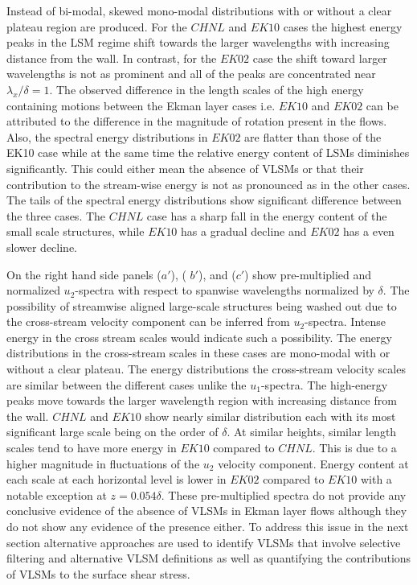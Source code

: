\documentclass{amsart}
\begin{document}
Instead of bi-modal, skewed mono-modal distributions with or without a clear plateau region are produced. For the $CHNL$ and $EK10$ cases the highest energy peaks in the LSM regime shift towards the larger wavelengths with increasing distance from the wall. In contrast, for the $EK02$ case the shift toward  larger wavelengths is not as prominent and all of the peaks are concentrated near $\lambda_x/\delta=1$. The observed difference in the length scales of the high energy containing motions between the Ekman layer cases i.e. $EK10$ and $EK02$ can be attributed to the difference in the magnitude of rotation present in the flows. Also, the spectral energy distributions in $EK02$  are flatter than those of the EK10 case while at the same time the relative energy content of LSMs diminishes significantly. This could either mean the absence of VLSMs or that their contribution to the stream-wise energy is not as pronounced as in the other cases. The tails of the spectral energy distributions show significant difference between the three cases. The $CHNL$ case has a sharp fall in the energy content of the small scale structures, while $EK10$ has  a gradual decline and $EK02$ has a even slower decline. 

On the right hand side panels  ($a'$), ( $b'$), and ($c'$) show pre-multiplied and normalized $u_2$-spectra with respect to spanwise wavelengths normalized by $\delta$. The possibility  of streamwise aligned large-scale structures  being washed out due to the cross-stream velocity component can be inferred from $u_2$-spectra. Intense energy in the cross stream scales would indicate such a possibility. The energy  distributions in the cross-stream scales in these cases are mono-modal with or without a clear plateau. The energy distributions the cross-stream velocity scales are similar between the different cases unlike the $u_1$-spectra. The high-energy peaks move towards the larger wavelength region with increasing distance from the wall. $CHNL$ and $EK10$  show nearly similar distribution each with its most significant large scale being on the order of $\delta$. At similar heights,  similar length scales tend to have more energy in $EK10$ compared to $CHNL$. This is due to a higher magnitude in fluctuations of the $u_2$ velocity component. Energy content at each scale at each horizontal level is lower in $EK02$ compared to $EK10$ with a notable exception at $z= 0.054\delta$. These pre-multiplied spectra do not provide any conclusive evidence of the absence of VLSMs in Ekman layer  flows although they do not show any evidence of the presence either.  To address this issue in the next section alternative approaches are used to identify VLSMs that involve selective filtering and alternative VLSM definitions as well as quantifying the contributions of VLSMs to the surface shear stress.
\end{document}
